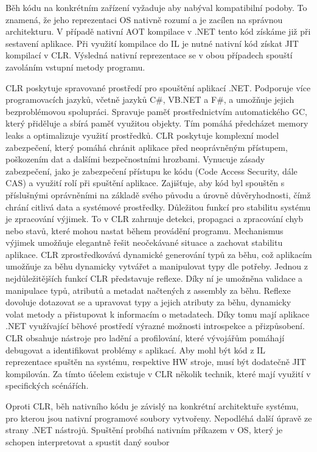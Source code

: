 Běh kódu na konkrétním zařízení vyžaduje aby nabýval kompatibilní podoby. To znamená, že jeho reprezentaci OS nativně rozumí a je zacílen na správnou architekturu. V případě nativní AOT kompilace v .NET tento kód získáme již při sestavení aplikace. Při využití kompilace do IL je nutné nativní kód získat JIT kompilací v CLR. Výsledná nativní reprezentace se v obou případech spouští zavoláním vstupní metody programu.

CLR poskytuje spravované prostředí pro spouštění aplikací .NET. Podporuje více programovacích jazyků, včetně jazyků C\#, VB.NET a F\#, a umožňuje jejich bezproblémovou spolupráci. Spravuje paměť prostřednictvím automatického GC, který přiděluje a sbírá paměť využitou objekty. \cite{Richter2012} Tím pomáhá předcházet memory leaks a optimalizuje využití prostředků. CLR poskytuje komplexní model zabezpečení, který pomáhá chránit aplikace před neoprávněným přístupem, poškozením dat a dalšími bezpečnostními hrozbami. Vynucuje zásady zabezpečení, jako je zabezpečení přístupu ke kódu (Code Access Security, dále CAS) a využití rolí při spuštění aplikace. \cite{Richter2012} Zajišťuje, aby kód byl spouštěn s příslušnými oprávněními na základě svého původu a úrovně důvěryhodnosti, čímž chrání citlivá data a systémové prostředky. Důležitou funkcí pro stabilitu systému je zpracování výjimek. To v CLR zahrnuje detekci, propagaci a zpracování chyb nebo stavů, které mohou nastat během provádění programu. Mechanismus výjimek umožňuje elegantně řešit neočekávané situace a zachovat stabilitu aplikace. CLR zprostředkovává dynamické generování typů za běhu, což aplikacím umožňuje za běhu dynamicky vytvářet a manipulovat typy dle potřeby. \cite{Richter2012} Jednou z nejdůležitějších funkcí CLR představuje reflexe. Díky ní je umožněna validace a manipulace typů, atributů a metadat načtených z assembly za běhu. Reflexe dovoluje dotazovat se a upravovat typy a jejich atributy za běhu, dynamicky volat metody a přistupovat k informacím o metadatech. Díky tomu mají aplikace .NET využívající běhové prostředí výrazné možnosti introspekce a přizpůsobení. CLR obsahuje nástroje pro ladění a profilování, které vývojářům pomáhají debugovat a identifikovat problémy s aplikací. Aby mohl být kód z IL reprezentace spuštěn na systému, respektive HW stroje, musí být dodatečně JIT kompilován. Za tímto účelem existuje v CLR několik technik, které mají využití v specifických scénářích.

Oproti CLR, běh nativního kódu je závislý na konkrétní architektuře systému, pro kterou jsou nativní programové soubory vytvořeny. Nepodléhá další úpravě ze strany .NET nástrojů. Spuštění probíhá nativním příkazem v OS, který je schopen interpretovat a spustit daný soubor

